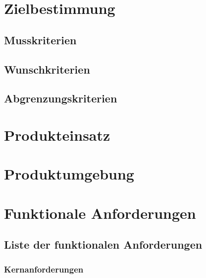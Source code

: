 \documentclass[a4paper,12pt]{article}
\begin{document}
\section{Zielbestimmung}
\subsection{Musskriterien}
\subsection{Wunschkriterien}
\subsection{Abgrenzungskriterien}

\section{Produkteinsatz}

\section{Produktumgebung}

\section{Funktionale Anforderungen}
\subsection{Liste der funktionalen Anforderungen}

\subsubsection{Kernanforderungen} %
\end{document}
